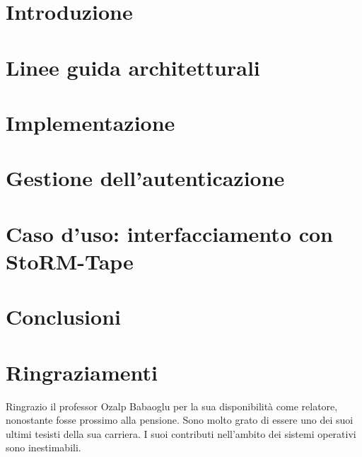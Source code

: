 \documentclass[12pt,a4paper,openright,twoside]{report}
\begin{document}
\clearpage{\pagestyle{empty}\cleardoublepage}

\chapter{Introduzione}
\lhead[\fancyplain{}{\bfseries\thepage}]{\fancyplain{}{\bfseries\rightmark}}


\chapter{Linee guida architetturali}
\lhead[\fancyplain{}{\bfseries\thepage}]{\fancyplain{}{\bfseries\rightmark}}


\chapter{Implementazione}
\lhead[\fancyplain{}{\bfseries\thepage}]{\fancyplain{}{\bfseries\rightmark}}


\chapter{Gestione dell'autenticazione}
\lhead[\fancyplain{}{\bfseries\thepage}]{\fancyplain{}{\bfseries\rightmark}}


\chapter{Caso d'uso: interfacciamento con StoRM-Tape}
\lhead[\fancyplain{}{\bfseries\thepage}]{\fancyplain{}{\bfseries\rightmark}}


\chapter{Conclusioni}
\lhead[\fancyplain{}{\bfseries\thepage}]{\fancyplain{}{\bfseries\rightmark}}




\chapter*{Ringraziamenti}
Ringrazio il professor Ozalp Babaoglu per la sua disponibilità come relatore, nonostante fosse prossimo alla pensione. 
Sono molto grato di essere uno dei suoi ultimi tesisti della sua carriera. I suoi contributi nell'ambito dei sistemi operativi sono inestimabili.  
\end{document}
